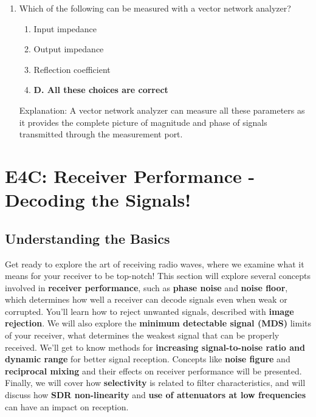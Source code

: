 \begin{enumerate}
    \item Which of the following can be measured with a vector network analyzer?
        \begin{enumerate}
        \item  Input impedance
        \item  Output impedance
       \item  Reflection coefficient
        \item \textbf{D. All these choices are correct}
        \end{enumerate}
         \textcolor{myred}{Explanation:}
        A vector network analyzer can measure all these parameters as it provides the complete picture of magnitude and phase of signals transmitted through the measurement port.

\end{enumerate}


\section{E4C: Receiver Performance - Decoding the Signals!}

\subsection*{Understanding the Basics}
Get ready to explore the art of receiving radio waves, where we examine what it means for your receiver to be top-notch! This section will explore several concepts involved in \textcolor{myblue}{\textbf{receiver performance}}, such as \textcolor{myblue}{\textbf{phase noise}} and \textcolor{myblue}{\textbf{noise floor}}, which determines how well a receiver can decode signals even when weak or corrupted. You'll learn how to reject unwanted signals, described with  \textcolor{myblue}{\textbf{image rejection}}. We will also explore the \textcolor{myblue}{\textbf{minimum detectable signal (MDS)}} limits of your receiver, what determines the weakest signal that can be properly received. We'll get to know methods for  \textcolor{myblue}{\textbf{increasing signal-to-noise ratio and dynamic range}} for better signal reception. Concepts like \textcolor{myblue}{\textbf{noise figure}} and \textcolor{myblue}{\textbf{reciprocal mixing}} and their effects on receiver performance will be presented. Finally, we will cover how \textcolor{myblue}{\textbf{selectivity}} is related to filter characteristics, and will discuss how \textcolor{myblue}{\textbf{SDR non-linearity}} and \textcolor{myblue}{\textbf{use of attenuators at low frequencies}} can have an impact on reception.

